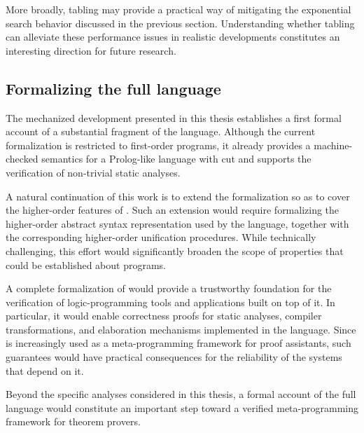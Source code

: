 More broadly, tabling may provide a practical way of mitigating the
exponential search behavior discussed in the previous section. Understanding
whether tabling can alleviate these performance issues in realistic \rocq
developments constitutes an interesting direction for future research.

\subsection{Formalizing the full \elpi language}

The mechanized development presented in this thesis establishes a first formal
account of a substantial fragment of the \elpi language. Although the current
formalization is restricted to first-order programs, it already provides a
machine-checked semantics for a Prolog-like language with cut and supports the
verification of non-trivial static analyses.

A natural continuation of this work is to extend the formalization so as to
cover the higher-order features of \elpi. Such an extension would require
formalizing the higher-order abstract syntax representation used by the
language, together with the corresponding higher-order unification procedures.
While technically challenging, this effort would significantly broaden the
scope of properties that could be established about \elpi programs.

A complete formalization of \elpi would provide a trustworthy foundation for
the verification of logic-programming tools and applications built on top of
it. In particular, it would enable correctness proofs for static analyses,
compiler transformations, and elaboration mechanisms implemented in the
language. Since \elpi is increasingly used as a meta-programming framework for
proof assistants, such guarantees would have practical consequences for the
reliability of the systems that depend on it.

Beyond the specific analyses considered in this thesis, a formal account of
the full \elpi language would constitute an important step toward a verified
meta-programming framework for theorem provers.

